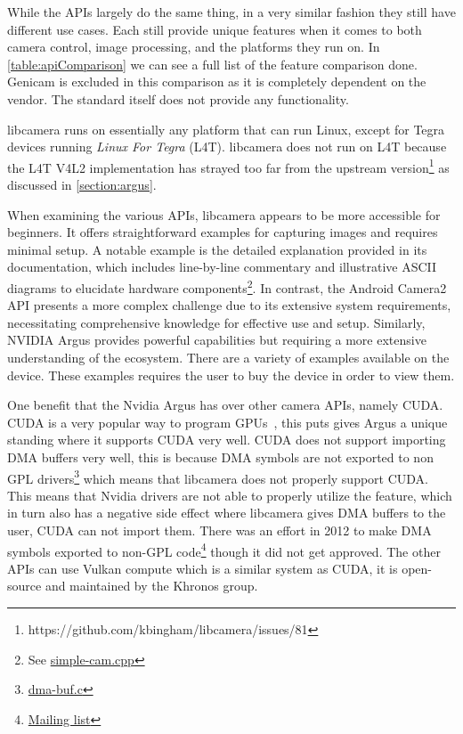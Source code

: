 While the APIs largely do the same thing, in a very similar fashion they still
have different use cases. Each still provide unique features when it comes to
both camera control, image processing, and the platforms they run on. In
\cref{table:apiComparison} we can see a full list of the feature comparison
done. Genicam is excluded in this comparison as it is completely dependent on
the vendor. The standard itself does not provide any functionality.

libcamera runs on essentially any platform that can run Linux, except for
Tegra devices running \textit{Linux For Tegra} (L4T). libcamera does not run
on L4T because the L4T V4L2 implementation has strayed too far from the
upstream version\footnote{https://github.com/kbingham/libcamera/issues/81} as
discussed in \cref{section:argus}.

When examining the various APIs, libcamera appears to be more accessible for
beginners. It offers straightforward examples for capturing images and requires
minimal setup. A notable example is the detailed explanation provided in its
documentation, which includes line-by-line commentary and illustrative ASCII
diagrams to elucidate hardware components\footnote{See \href{https://github.com/kbingham/simple-cam/blob/master/simple-cam.cpp}{simple-cam.cpp}}.
In contrast, the Android Camera2 API presents a more complex challenge due to
its extensive system requirements, necessitating comprehensive knowledge for
effective use and setup. Similarly, NVIDIA Argus provides powerful capabilities but
requiring a more extensive understanding of the ecosystem. There are a variety
of examples available on the device. These examples requires the user to buy
the device in order to view them.

One benefit that the Nvidia Argus has over other camera APIs, namely CUDA.
CUDA is a very popular way to program GPUs~\cite{kalaiselvi2017survey}, this
puts gives Argus a unique standing where it supports CUDA very well. CUDA does
not support importing DMA buffers very well, this is because DMA symbols are
not exported to non GPL drivers\footnote{\href{https://github.com/torvalds/linux/blob/master/drivers/dma-buf/dma-buf.c}{dma-buf.c}}
which means that libcamera does not properly support CUDA. This means that
Nvidia drivers are not able to properly utilize the feature, which in turn also
has a negative side effect where libcamera gives DMA buffers to the user, CUDA
can not import them. There was an effort in 2012 to make DMA symbols exported
to non-GPL code\footnote{\href{https://patchwork.kernel.org/project/dri-devel/patch/1349884592-32485-1-git-send-email-rmorell@nvidia.com/}{Mailing
list}} though it did not get approved. The other APIs can use Vulkan compute
which is a similar system as CUDA, it is open-source and maintained by the
Khronos group.

